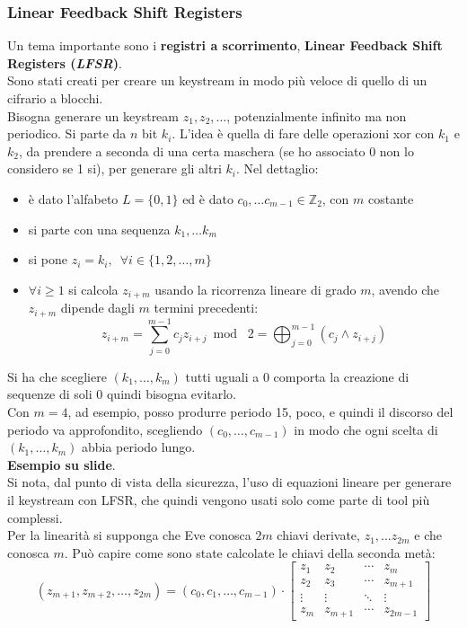 \documentclass[a4paper,12pt, oneside]{book}
\begin{document}
\subsubsection{Linear Feedback Shift Registers}
Un tema importante sono i \textbf{registri a scorrimento}, \textbf{Linear
  Feedback Shift Registers (\textit{LFSR})}.\\
Sono stati creati per creare un keystream in modo più veloce di quello di un
cifrario a blocchi.\\
Bisogna generare un keystream $z_1,z_2,\ldots$, potenzialmente infinito ma non
periodico. Si parte da $n$ bit $k_i$. L'idea è quella di fare delle operazioni
xor con $k_1$ e $k_2$, da prendere a seconda di una certa maschera (se ho
associato 0 non lo considero se 1 si), per generare
gli altri $k_i$. Nel dettaglio:
\begin{itemize}
  \item è dato l'alfabeto $L=\{0,1\}$ ed è dato $c_0,\ldots
  c_{m-1}\in\mathbb{Z}_2$, con $m$ costante
  \item si parte con una sequenza $k_1,\ldots k_m$
  \item si pone $z_i=k_i,\,\,\,\forall i\in\{1,2,\ldots,m\}$ 
  \item $\forall i\geq 1$ si calcola $z_{i+m}$ usando la ricorrenza lineare di
  grado $m$, avendo che $z_{i+m}$ dipende dagli $m$ termini precedenti:
  \[z_{i+m}=\sum_{j=0}^{m-1}c_jz_{i+j}\bmod\,\,2=\bigoplus_{j=0}^{m-1}(c_j\land
    z_{i+j})\] 
\end{itemize}
Si ha che scegliere $(k_1,\ldots,k_m)$ tutti uguali a 0 comporta la creazione di
sequenze di soli 0 quindi bisogna evitarlo.\\
Con $m=4$, ad esempio, posso produrre periodo 15, poco, e quindi il discorso del
periodo va approfondito, scegliendo $(c_0,\ldots,c_{m-1})$ in modo che ogni scelta
di $(k_1,\ldots,k_m)$ abbia periodo lungo.\\
\textbf{Esempio su slide}.\\
Si nota, dal punto di vista della sicurezza, l'uso di equazioni lineare per
generare il keystream con LFSR, che quindi vengono usati solo come parte di
tool più complessi. \\
Per la linearità si supponga che Eve conosca $2m$ chiavi derivate, $z_1,\ldots
z_{2m}$ e che conosca $m$. Può capire come sono state calcolate le chiavi della
seconda metà:
\[(z_{m+1},z_{m+2},\ldots, z_{2m})=(c_0,c_1,\ldots,c_{m-1})\cdot
  \left[
    \begin{matrix}
      z_1 & z_2 &\cdots &z_m\\
      z_2 & z_3 &\cdots &z_{m+1}\\
      \vdots & \vdots &\ddots &\vdots\\
      z_m & z_{m+1} &\cdots &z_{2m-1}
    \end{matrix}
  \right]
\]
\end{document}
